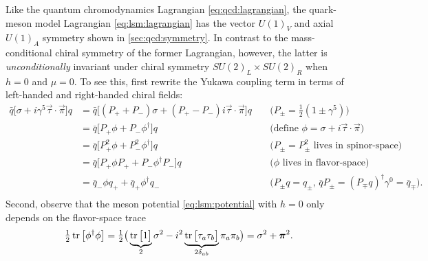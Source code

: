 Like the quantum chromodynamics Lagrangian \eqref{eq:qcd:lagrangian}, the quark-meson model Lagrangian \eqref{eq:lsm:lagrangian} has the vector $U(1)_V$ and axial $U(1)_A$ symmetry shown in \cref{sec:qcd:symmetry}.
In contrast to the mass-conditional chiral symmetry of the former Lagrangian, however, the latter is \emph{unconditionally} invariant under chiral symmetry $SU(2)_L \times SU(2)_R$ when $h=0$ and $\mu = 0$.
To see this, first rewrite the Yukawa coupling term in terms of left-handed and right-handed chiral fields:
\begin{equation}
\begin{aligned}
	\bar{q} \big[\sigma + i \gamma^5 \vec{\tau} \cdot \vec{\pi}\big] q &= \bar{q} \big[ (P_+ + P_-) \sigma + (P_+ - P_-) i \vec{\tau} \cdot \vec{\pi}\big] q && \; \big( P_\pm = \tfrac{1}{2} (1 \pm \gamma^5) \big) \\
	                                                           &= \bar{q} \big[ P_+ \phi + P_- \phi^\dagger\big] q && \; \big( \text{define } \phi=\sigma+i\vec{\tau}\cdot\vec{\pi} \big) \\
	                                                           &= \bar{q} \big[ P_+^2 \phi + P_-^2 \phi^\dagger\big] q && \; \big( \text{$P_\pm=P_\pm^2$ lives in spinor-space} \big) \\
	                                                           &= \bar{q} \big[ P_+ \phi P_+ + P_- \phi^\dagger P_-\big] q && \; \big( \text{$\phi$ lives in flavor-space} \big)\\
	                                                           &= \bar{q}_- \phi q_+ + \bar{q}_+ \phi^\dagger q_- && \; \big( \text{$P_\pm q = q_\pm$, $\bar{q} P_\pm = (P_\mp q)^\dagger \gamma^0 = \bar{q}_\mp$} \big).\\
\end{aligned}
\label{eq:lsm:yukawa_symmetry}
\end{equation}
Second, observe that the meson potential \eqref{eq:lsm:potential} with $h=0$ only depends on the flavor-space trace
\begin{equation}
	\tfrac12 \operatorname{tr}\big[\phi^\dagger \phi\big] = \tfrac12 \big( \underbrace{\operatorname{tr}\big[1\big]}_2 \sigma^2 - i^2 \underbrace{\operatorname{tr}\big[\tau_a \tau_b \big]}_{2 \delta_{ab}} \pi_a \pi_b \big) = \sigma^2 + {\bm{\pi}}^2.
\label{eq:lsm:meson_symmetry}
\end{equation}
